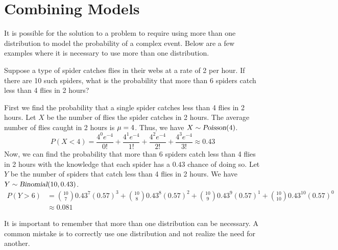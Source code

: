 \section{Combining Models}
It is possible for the solution to a problem to require using more than one distribution to model the probability of a complex event. Below are a few examples where it is necessary to use more than one distribution.
\begin{example}
    Suppose a type of spider catches flies in their webs at a rate of 2 per hour. If there are 10 such spiders, what is the probability that more than 6 spiders catch less than 4 flies in 2 hours?
    \par\smallskip
    First we find the probability that a single spider catches less than 4 flies in 2 hours. Let $X$ be the number of flies the spider catches in 2 hours. The average number of flies caught in 2 hours is $\mu = 4$. Thus, we have $X \sim \operatorname{\textsl{Poisson}}(4)$.
    \[
        P(X < 4) = \frac{4^0 e^{-4}}{0!} + \frac{4^1 e^{-4}}{1!} + \frac{4^2 e^{-4}}{2!} + \frac{4^3 e^{-4}}{3!} 
        \approx 0.43
    \]
    Now, we can find the probability that more than 6 spiders catch less than 4 flies in 2 hours with the knowledge that each spider has a $0.43$ chance of doing so. Let $Y$ be the number of spiders that catch less than 4 flies in 2 hours. We have $Y \sim \operatorname{\textsl{Binomial}}(10,0.43)$.
    \begin{align*}
        P(Y > 6) &= \binom{10}{7}0.43^7 (0.57)^{3} + \binom{10}{8}0.43^8 (0.57)^{2} + \binom{10}{9}0.43^9 (0.57)^{1} + \binom{10}{10}0.43^{10} (0.57)^{0} \\
        &\approx 0.081
    \end{align*}
\end{example}
\begin{info}
It is important to remember that more than one distribution can be necessary. A common mistake is to correctly use one distribution and not realize the need for another.
\end{info}
